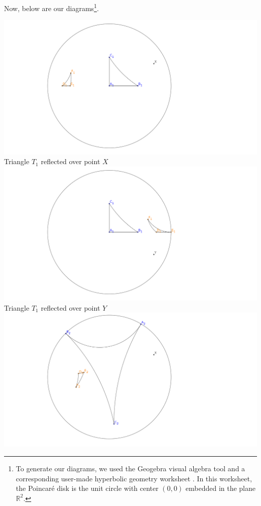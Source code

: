 \documentclass[12pt]{article}
\newcommand{\R}{\mathbb{R}}
\newcommand{\poincare}{Poincar\'{e} }
\theoremstyle{plain}
\theoremstyle{definition}
\begin{document}
Now, below are our diagrams\footnote{To generate our diagrams, we used the Geogebra visual algebra tool \cite{geogebra_software} and a corresponding user-made hyperbolic geometry worksheet \cite{hyperbolic_worksheet}. In this worksheet, the \poincare disk is the unit circle with center $(0,0)$ embedded in the plane $\R^2$.}.

\begin{center}
\includegraphics[width=160mm]{../images/t1_over_x.png} \\
Triangle $T_1$ reflected over point $X$ 
\[\]
\includegraphics[width=160mm]{../images/t1_over_y.png} \\
Triangle $T_1$ reflected over point $Y$  
\[\]
\includegraphics[width=160mm]{../images/t2_over_x.png} \\

\end{center}
\end{document}
